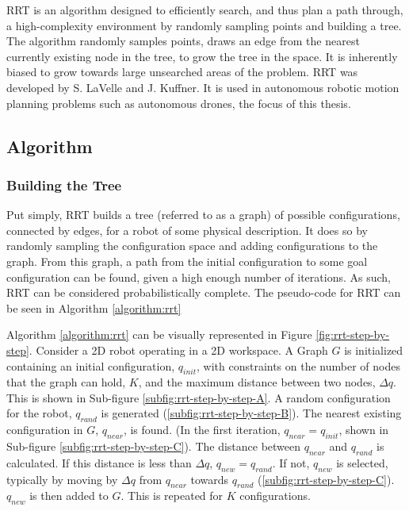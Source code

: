 
\gls{RRT} is an algorithm designed to efficiently search, and thus plan a path through, a high-complexity environment by randomly sampling points and building a tree. The algorithm randomly samples points, draws an edge from the nearest currently existing node in the tree, to grow the tree in the space. It is inherently biased to grow towards large unsearched areas of the problem. RRT was developed by S. LaVelle\cite{LaValle1998} and J. Kuffner\cite{LaValle2001}. It is used in autonomous robotic motion planning problems such as autonomous drones, the focus of this thesis.

\subsection{Algorithm}
    
    \subsubsection*{Building the Tree}

        Put simply, \gls{RRT} builds a tree (referred to as a graph) of possible \gls{configuration}s, connected by edges, for a robot of some physical description. It does so by randomly sampling the \gls{configuration} space and adding \gls{configuration}s to the graph. From this graph, a path from the initial \gls{configuration} to some goal \gls{configuration} can be found, given a high enough number of iterations. As such, \gls{RRT} can be considered \gls{probabilistically complete}.
        The pseudo-code for \gls{RRT} can be seen in Algorithm \ref{algorithm:rrt}
        
        

        Algorithm \ref{algorithm:rrt} can be visually represented in Figure \ref{fig:rrt-step-by-step}. Consider a \gls{2D} robot operating in a \gls{2D} workspace. A Graph $G$ is initialized containing an initial \gls{configuration}, $q_{init}$, with constraints on the number of nodes that the graph can hold, $K$, and the maximum distance between two nodes, $\Delta q$. This is shown in Sub-figure \ref{subfig:rrt-step-by-step-A}. A random \gls{configuration} for the robot, $q_{rand}$ is generated (\ref{subfig:rrt-step-by-step-B}). The nearest existing \gls{configuration} in $G$, $q_{near}$, is found. (In the first iteration, $q_{near} = q_{init}$, shown in Sub-figure \ref{subfig:rrt-step-by-step-C}). The distance between $q_{near}$ and $q_{rand}$ is calculated. If this distance is less than $\Delta q$, $q_{new} = q_{rand}$. If not, $q_{new}$ is selected, typically by moving by $\Delta q$ from $q_{near}$ towards $q_{rand}$ (\ref{subfig:rrt-step-by-step-C}). $q_{new}$ is then added to $G$. This is repeated for $K$ \gls{configuration}s.

